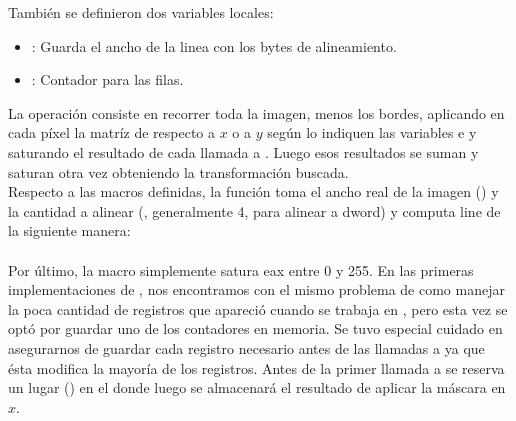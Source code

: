 Tambi\'en se definieron dos variables locales:
\begin{itemize}
	\item {}: Guarda el ancho de la linea con los bytes de alineamiento.
	\item {}: Contador para las filas.
\end{itemize}

La operaci\'on consiste en recorrer toda la imagen, menos los bordes, aplicando en cada p\'ixel la matr\'iz de 
 respecto a $x$ o a $y$ seg\'un lo indiquen las variables  e  y saturando el 
resultado de cada llamada a . Luego esos resultados se suman y saturan otra vez obteniendo 
la transformaci\'on buscada.\\

Respecto a las macros definidas, la funci\'on  toma el ancho real de la imagen 
() y la cantidad a alinear (, generalmente 4, para alinear a dword) y computa line de la 
siguiente manera:\\

\\

Por \'ultimo, la macro  simplemente satura eax entre 0 y 255.
En las primeras implementaciones de , nos encontramos con el mismo problema de como manejar la 
poca cantidad de registros que apareci\'o cuando se trabaja en , pero esta vez se opt\'o por guardar 
uno de los contadores en memoria. Se tuvo especial cuidado en asegurarnos de guardar cada registro necesario antes 
de las llamadas a  ya que \'esta modifica la mayor\'ia de los registros. Antes de la primer llamada
a  se reserva un lugar () en el  donde luego se almacenar\'a
el resultado de aplicar la m\'ascara en $x$.\\

